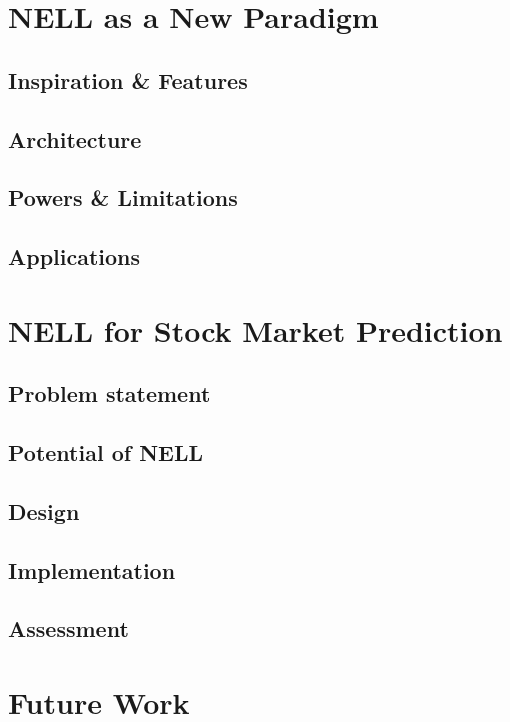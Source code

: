 \documentclass[12pt]{article}  %
\begin{document}
\section{NELL as a New Paradigm}

\subsection{Inspiration \& Features}
\subsection{Architecture}
\subsection{Powers \& Limitations}
\subsection{Applications}



\section{NELL for Stock Market Prediction}

\subsection{Problem statement}
\subsection{Potential of NELL}
\subsection{Design}
\subsection{Implementation}
\subsection{Assessment}


\section{Future Work}
\end{document}
